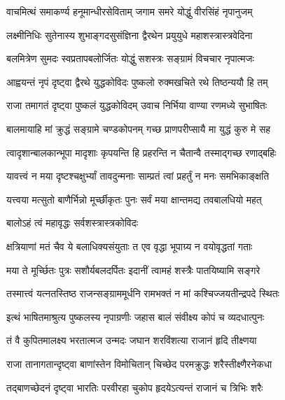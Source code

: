 \twolineshloka
{वाचमित्थं समाकर्ण्य हनूमान्धीरसेविताम्}
{जगाम समरे योद्धुं वीरसिंहं नृपानुजम्}%

\twolineshloka
{लक्ष्मीनिधिः सुतेनास्य शुभाङ्गदसुसंज्ञिना}
{द्वैरथेन प्रयुयुधे महाशस्त्रास्त्रवेदिना}%

\twolineshloka
{बलमित्रेण सुमदः स्वप्रतापबलोर्जितः}
{योद्धुं सशस्त्रः सङ्ग्रामं विचचार नृपात्मजः}%

\twolineshloka
{आह्वयन्तं नृपं दृष्ट्वा द्वैरथे युद्धकोविदः}
{पुष्कलो रुक्मखचिते रथे तिष्ठन्ययौ हि तम्}%

\twolineshloka
{राजा तमागतं दृष्ट्वा पुष्कलं युद्धकोविदम्}
{उवाच निर्भिया वाण्या रणमध्ये सुभाषितः}%


\twolineshloka
{बालमायाहि मां क्रुद्धं सङ्ग्रामे चण्डकोपनम्}
{गच्छ प्राणपरीप्सायै मा युद्धं कुरु मे सह}%

\twolineshloka
{त्वादृशान्बालकान्भूपा मादृशाः कृपयन्ति हि}
{प्रहरन्ति न चैतान्वै तस्माद्गच्छ रणाद्बहिः}%

\twolineshloka
{यावत्त्वं न मया दृष्टश्चक्षुर्भ्यां तावदुन्मनाः}
{साम्प्रतं त्वां प्रहर्तुं न मनः समभिकाङ्क्षति}%

\twolineshloka
{यत्त्वया मत्सुतो बाणैर्भिन्नो मूर्च्छीकृतः पुनः}
{सर्वं मया क्षान्तमद्य तवबालधियो महत्}%



\onelineshloka
{बालोऽहं त्वं महावृद्धः सर्वशस्त्रास्त्रकोविदः}%

\twolineshloka
{क्षत्रियाणां मतं चैव ये बलाधिक्यसंयुताः}
{त एव वृद्धा भूपाग्र्य न वयोवृद्धतां गताः}%

\twolineshloka
{मया ते मूर्च्छितः पुत्रः सशौर्यबलदर्पितः}
{इदानीं त्वामहं शस्त्रैः पातयिष्यामि सङ्गरे}%

\twolineshloka
{तस्मात्त्वं यत्नतस्तिष्ठ राजन्सङ्ग्राममूर्धनि}
{रामभक्तं न मां कश्चिज्जयतीन्द्रपदे स्थितः}%

\twolineshloka
{इत्थं भाषितमाश्रुत्य पुष्कलस्य नृपाग्रणीः}
{जहास बालं संवीक्ष्य कोपं च व्यदधात्पुनः}%

\twolineshloka
{तं वै कुपितमालक्ष्य भरतात्मज उन्मदः}
{जघान शरविंशत्या राजानं हृदि तीक्ष्णया}%

\twolineshloka
{राजा तानागतान्दृष्ट्वा बाणांस्तेन विमोचितान्}
{चिच्छेद परमक्रुद्धः शरैस्तीक्ष्णैरनेकधा}%

\twolineshloka
{तद्बाणच्छेदनं दृष्ट्वा भारतिः परवीरहा}
{चुकोप हृदयेऽत्यन्तं राजानं च त्रिभिः शरैः}%

